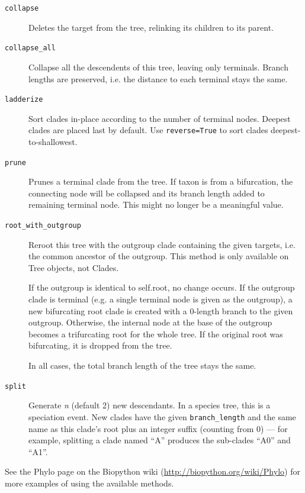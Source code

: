 \documentclass{report}
\begin{document}
\begin{description}
  \item[\texttt{collapse}]
    Deletes the target from the tree, relinking its children to its parent.

  \item[\texttt{collapse\_all}]
    Collapse all the descendents of this tree, leaving only terminals. Branch lengths are
    preserved, i.e. the distance to each terminal stays the same.

  \item[\texttt{ladderize}]
    Sort clades in-place according to the number of terminal nodes.  Deepest clades are placed
    last by default. Use \verb|reverse=True| to sort clades deepest-to-shallowest.

  \item[\texttt{prune}]
    Prunes a terminal clade from the tree.  If taxon is from a bifurcation, the connecting node
    will be collapsed and its branch length added to remaining terminal node. This might no
    longer be a meaningful value.

  \item[\texttt{root\_with\_outgroup}]
    Reroot this tree with the outgroup clade containing the given targets, i.e. the common
    ancestor of the outgroup. This method is only available on Tree objects, not Clades.

    If the outgroup is identical to self.root, no change occurs. If the outgroup clade is
    terminal (e.g. a single terminal node is given as the outgroup), a new bifurcating root
    clade is created with a 0-length branch to the given outgroup. Otherwise, the internal node
    at the base of the outgroup becomes a trifurcating root for the whole tree. If the original
    root was bifurcating, it is dropped from the tree.

    In all cases, the total branch length of the tree stays the same.

  \item[\texttt{split}]
    Generate \textit{n} (default 2) new descendants. In a species tree, this is a speciation
    event.  New clades have the given \verb|branch_length| and the same name as this clade's
    root plus an integer suffix (counting from 0) --- for example, splitting a clade named
    ``A'' produces the sub-clades ``A0'' and ``A1''.

\end{description}

See the Phylo page on the Biopython wiki (\url{http://biopython.org/wiki/Phylo}) for
more examples of using the available methods.
\end{document}
